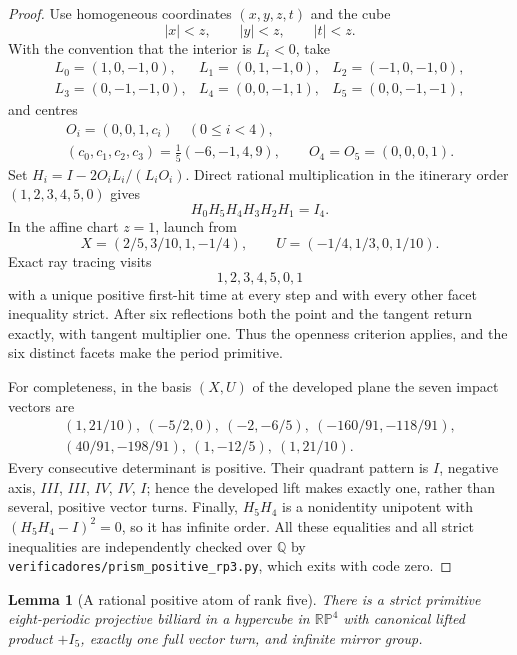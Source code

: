 \documentclass[11pt,a4paper]{article}
\theoremstyle{plain}
\newtheorem{lemma}[theorem]{Lemma}
\theoremstyle{definition}
\theoremstyle{remark}
\begin{document}
\begin{proof}
Use homogeneous coordinates $(x,y,z,t)$ and the cube
\[
 |x|<z,\qquad |y|<z,\qquad |t|<z.
\]
With the convention that the interior is $L_i<0$, take
\[
\begin{array}{lll}
L_0=(1,0,-1,0),&L_1=(0,1,-1,0),&L_2=(-1,0,-1,0),\\
L_3=(0,-1,-1,0),&L_4=(0,0,-1,1),&L_5=(0,0,-1,-1),
\end{array}
\]
and centres
\[
 \begin{gathered}
 O_i=(0,0,1,c_i)\quad(0\le i<4),\\
 (c_0,c_1,c_2,c_3)=\frac15(-6,-1,4,9),\qquad
 O_4=O_5=(0,0,0,1).
 \end{gathered}
\]
Set $H_i=I-2O_iL_i/(L_iO_i)$.  Direct rational multiplication in the
itinerary order $(1,2,3,4,5,0)$ gives
\[
                         H_0H_5H_4H_3H_2H_1=I_4.
\]
In the affine chart $z=1$, launch from
\[
 X=(2/5,3/10,1,-1/4),\qquad U=(-1/4,1/3,0,1/10).
\]
Exact ray tracing visits
\[
                         1,2,3,4,5,0,1
\]
with a unique positive first-hit time at every step and with every other facet
inequality strict.  After six reflections both the point and the tangent return
exactly, with tangent multiplier one.  Thus the openness criterion applies, and
the six distinct facets make the period primitive.

For completeness, in the basis $(X,U)$ of the developed plane the seven impact
vectors are
\[
 \begin{gathered}
 (1,21/10),\ (-5/2,0),\ (-2,-6/5),\ (-160/91,-118/91),\\
 (40/91,-198/91),\ (1,-12/5),\ (1,21/10).
 \end{gathered}
\]
Every consecutive determinant is positive.  Their quadrant pattern is
$I$, negative axis, $III$, $III$, $IV$, $IV$, $I$; hence the developed lift
makes exactly one, rather than several, positive vector turns.  Finally,
$H_5H_4$ is a nonidentity unipotent with $(H_5H_4-I)^2=0$, so it has infinite
order.  All these equalities and all strict inequalities are independently
checked over $\mathbb Q$ by
\texttt{verificadores/}\allowbreak\texttt{prism\_positive\_rp3.py}, which
exits with code zero.
\end{proof}

\begin{lemma}[A rational positive atom of rank five]
\label{lem:rational-positive-hypercube}
There is a strict primitive eight-periodic projective billiard in a hypercube in
$\mathbb {RP}^4$ with canonical lifted product $+I_5$, exactly one full vector
turn, and infinite mirror group.
\end{lemma}
\end{document}
